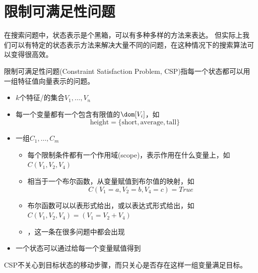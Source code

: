 
\section{限制可满足性问题}

在搜索问题中，状态表示是个黑箱，可以有多种多样的方法来表达。
但实际上我们可以有特定的状态表示方法来解决大量不同的问题，在这种情况下的搜索算法可以变得很高效。

限制可满足性问题(Constraint Satisfaction Problem, CSP)指每一个状态都可以用一组特征值向量表示的问题。
\begin{itemize}
	\item $k$个特征/的集合$V_1,\ldots,V_n$
	\item 每一个变量都有一个包含有限值的$\dom[V_i]$，如
	\[\text{height}=\{\text{short},\text{average},\text{tall}\}\]
	\item 一组$C_1,\ldots,C_m$
	\begin{itemize}
		\item 每个限制条件都有一个作用域(scope)，表示作用在什么变量上，如$C(V_1,V_2,V_4)$
		\item 相当于一个布尔函数，从变量赋值到布尔值的映射，如
		\[C(V_1=a,V_2=b,V_4=c)=True\]
		\item 布尔函数可以以表形式给出，或以表达式形式给出，如$C(V_1,V_2,V_4)=(V_1=V_2+V_4)$
		\item {}，这一条在很多问题中都会出现
	\end{itemize}
	\item 一个状态可以通过给每一个变量赋值得到
\end{itemize}

CSP不关心到目标状态的移动步骤，而只关心是否存在这样一组变量满足目标。

